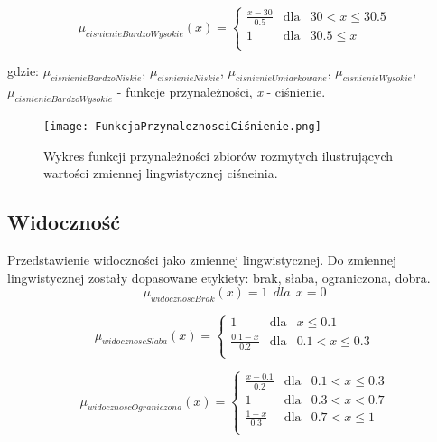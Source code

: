 \documentclass{classrep}
\begin{document}
\begin{equation}
\mu _{cisnienieBardzoWysokie}(x) =  \left\{ \begin{array}{rcl}
\frac{x - 30}{0.5} & \mbox{dla} & 30 < x \leq 30.5\\
1 & \mbox{dla} & 30.5 \leq x\\
\end{array}\right.
\end{equation}


gdzie: \(\mu _{cisnienieBardzoNiskie}\), \(\mu _{cisnienieNiskie}\), \(\mu _{cisnienieUmiarkowane}\), \(\mu _{cisnienieWysokie}\), \(\mu _{cisnienieBardzoWysokie}\) - funkcje przynależności, \textit{x} - ciśnienie. 

\begin{figure}[h!]
 \centering
 \texttt{[image: FunkcjaPrzynaleznosciCiśnienie.png]}
 \vspace{-0.3cm}
 \caption{Wykres funkcji przynależności zbiorów rozmytych ilustrujących wartości zmiennej lingwistycznej ciśneinia. }
 \label{rysunek do eksperymentu 1 wariantu 1}
\end{figure}
\newpage



\subsection{Widoczność}
Przedstawienie widoczności jako zmiennej lingwistycznej. Do zmiennej lingwistycznej zostały dopasowane etykiety: brak, słaba, ograniczona, dobra. 
\begin{equation}
\mu _{widocznoscBrak}(x) =   1 \ \ dla \ \ x  = 0
\end{equation}

\begin{equation}
\mu _{widocznoscSlaba}(x) =  \left\{ \begin{array}{rcl}
 1 & \mbox{dla} & x  \leq 0.1 \\
\frac{0.1 - x}{0.2} & \mbox{dla} & 0.1 < x \leq 0.3\\
\end{array}\right.
\end{equation}

\begin{equation}
\mu _{widocznoscOgraniczona}(x) =  \left\{ \begin{array}{rcl}
\frac{x - 0.1}{0.2} & \mbox{dla} & 0.1 < x \leq 0.3\\
1 & \mbox{dla} & 0.3 < x < 0.7\\
\frac{1 - x}{0.3} & \mbox{dla} & 0.7 < x \leq1\\
\end{array}\right.
\end{equation}
\end{document}

